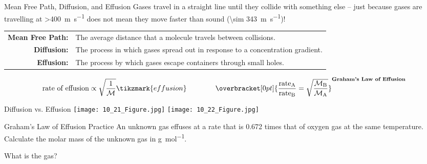 \documentclass[notes=hide]{beamer}
\begin{document}
\clearpage

\begin{frame}{Mean Free Path, Diffusion, and Effusion}
	Gases travel in a straight line until they collide with something else
	-- just because gases are travelling at \SI{>400}{\meter\per\second}
	does not mean they move faster than sound (\SI{\sim
	343}{\meter\per\second})!

	{\renewcommand\arraystretch{1.5}
	\begin{tabularx}{\linewidth} {>{\bfseries}r X}
		Mean Free Path: & The average distance that a molecule
		  travels between collisions. \\
		Diffusion: & The process in which gases spread out in
		  response to a concentration gradient. \\
		Effusion: & The process by which gases escape containers
			through small holes.
	\end{tabularx}}

	\begin{align*}
		\text{rate of effusion} \propto
		\sqrt{\frac{1}{\mathcal{M}}}\tikzmark{effusion}
		\qquad\qquad
		\overbracket[0pt]{\frac{\text{rate}_\text{A}}{\text{rate}_\text{B}} =
		\sqrt{\frac{\mathcal{M}_\text{B}}{\mathcal{M}_\text{A}}}}^{\textbf{Graham's
		Law of Effusion}}
	\end{align*}
\end{frame}


\begin{frame}{Diffusion vs. Effusion}
	\texttt{[image: 10\_21\_Figure.jpg]}
	\hfill
	\texttt{[image: 10\_22\_Figure.jpg]}
\end{frame}


\begin{frame}[t]{Graham's Law of Effusion Practice}
	An unknown gas effuses at a rate that is \num{0.672} times that of
	oxygen gas at the same temperature. Calculate the molar mass of the
	unknown gas in \si{\gram\per\mole}.

	\vfill


	\pause

	What is the gas?
\end{frame}
\end{document}

